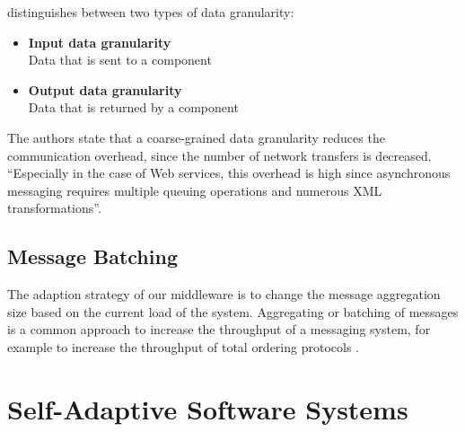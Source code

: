\cite{Haesen:2008ve} distinguishes between two types of data granularity:
\begin{itemize}
	\item \textbf{Input data granularity}\\
	Data that is sent to a component
	\item \textbf{Output data granularity}\\
	Data that is returned by a component
\end{itemize}
The authors state that a coarse-grained data granularity reduces the communication overhead, since the number of network transfers is decreased.
``Especially in the case of Web services, this overhead is high since asynchronous messaging requires multiple queuing operations and numerous XML transformations''.

\subsection{Message Batching}
The adaption strategy of our middleware is to change the message aggregation size based on the current load of the system. Aggregating or batching of messages is a common approach to increase the throughput of a messaging system, for example to increase the throughput of total ordering protocols \citep{Friedman:1997aa} \citep{Friedman:2006aa} \citep{Romano:2012aa} \citep{Didona:2012aa}.

\section{Self-Adaptive Software Systems}


